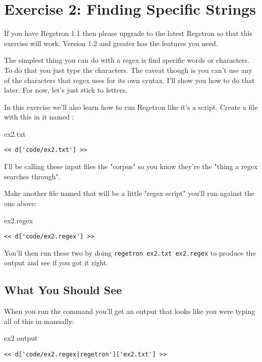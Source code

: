 \chapter{Exercise 2: Finding Specific Strings}

\begin{note}
If you have Regetron 1.1 then please upgrade to the latest Regetron so that
this exercise will work.  Version 1.2 and greater has the features you need.
\end{note}

The simplest thing you can do with a regex is find specific words or characters.
To do that you just type the characters.  The caveat though is you can't use any
of the characters that regex uses for its own syntax.  I'll show you how to do that
later.  For now, let's just stick to letters.

In this exercise we'll also learn how to run Regetron like it's a script.
Create a file with this in it named :

\begin{code}{ex2.txt}
\begin{Verbatim}
<< d['code/ex2.txt'] >>
\end{Verbatim}
\end{code}

I'll be calling these input files the "corpus" so you know they're the
"thing a regex searches through".

Make another file named  that will be a little
"regex script" you'll run against the one above:

\begin{code}{ex2.regex}
\begin{Verbatim}
<< d['code/ex2.regex'] >>
\end{Verbatim}
\end{code}

You'll then run these two by doing \verb|regetron ex2.txt ex2.regex| 
to produce the output and see if you got it right.

\section{What You Should See}

When you run the command you'll get an output that looks like you 
were typing all of this in manually:

\begin{code}{ex2 output}
\begin{Verbatim}
<< d['code/ex2.regex|regetron']['ex2.txt'] >>
\end{Verbatim}
\end{code}


